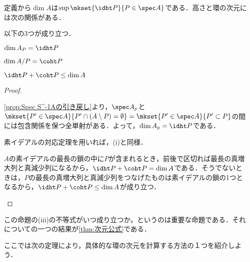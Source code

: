 定義から$\dim A$は$\sup\mkset{\idht P}{P\in\spec A}$である．高さと環の次元には次の関係がある．
	
\begin{prop}\label{prop:htとcohtの定義}
	以下の3つが成り立つ．
	\begin{sakura}
		\item $\dim A_P=\idht P$
		\item $\dim A/P=\coht P$
		\item $\idht P+\coht P\leq\dim A$
	\end{sakura}
\end{prop}

\begin{proof}
	\begin{sakura}
		\item 
			\ref{prop:Spec S^-1Aの引き戻し}より，$\spec A_p$と$\mkset{ P '\in\spec A}{ P '\cap (A\setminus P )=\emptyset}=\mkset{ P '\in\spec A}{ P '\subset P }$の間には包含関係を保つ全単射がある．よって，$\dim A_p=\idht P $である．
		\item 
			素イデアルの対応定理を用いれば，(i)と同様．
		\item 
			$A$の素イデアルの最長の鎖の中に$ P $が含まれるとき，前後で区切れば最長の真増大列と真減少列になるから，$\idht P +\coht P =\dim A$である．そうでないときは，$ P $の最長の真増大列と真減少列をつなげたものは素イデアルの鎖の1つとなるから，$\idht P +\coht P \leq\dim A$が成り立つ．
	\end{sakura}
\end{proof}
	
この命題の(iii)の不等式がいつ成り立つか，というのは重要な命題である．それについての一つの結果が\ref{thm:次元公式}である．

ここでは次の定理により，具体的な環の次元を計算する方法の１つを紹介しよう．

